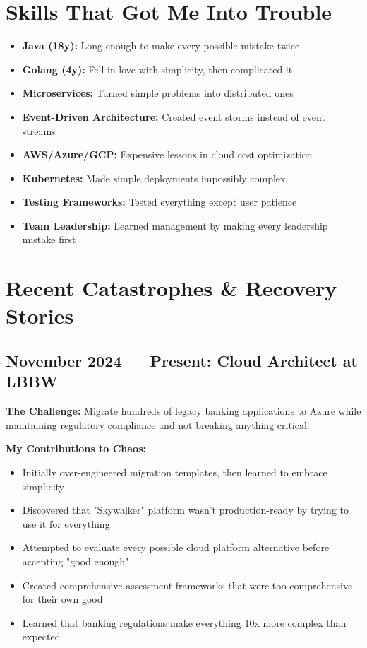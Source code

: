 \documentclass[10pt,a4paper]{article}
\begin{document}
\section*{Skills That Got Me Into Trouble}

\begin{multicols}{2}
\begin{itemize}[leftmargin=1em,topsep=0pt,itemsep=0pt]
\item \textbf{Java (18y):} Long enough to make every possible mistake twice
\item \textbf{Golang (4y):} Fell in love with simplicity, then complicated it
\item \textbf{Microservices:} Turned simple problems into distributed ones
\item \textbf{Event-Driven Architecture:} Created event storms instead of event streams
\item \textbf{AWS/Azure/GCP:} Expensive lessons in cloud cost optimization
\item \textbf{Kubernetes:} Made simple deployments impossibly complex
\item \textbf{Testing Frameworks:} Tested everything except user patience
\item \textbf{Team Leadership:} Learned management by making every leadership mistake first
\end{itemize}
\end{multicols}

\section*{Recent Catastrophes \& Recovery Stories}

\subsection*{November 2024 — Present: Cloud Architect at LBBW}
\textbf{The Challenge:} Migrate hundreds of legacy banking applications to Azure while maintaining regulatory compliance and not breaking anything critical.

\textbf{My Contributions to Chaos:}
\begin{itemize}[leftmargin=1em,topsep=0pt,itemsep=0pt]
\item Initially over-engineered migration templates, then learned to embrace simplicity
\item Discovered that "Skywalker" platform wasn't production-ready by trying to use it for everything
\item Attempted to evaluate every possible cloud platform alternative before accepting "good enough"
\item Created comprehensive assessment frameworks that were too comprehensive for their own good
\item Learned that banking regulations make everything 10x more complex than expected
\end{itemize}
\end{document}
